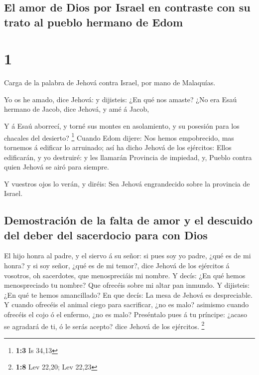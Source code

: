 \hypertarget{el-amor-de-dios-por-israel-en-contraste-con-su-trato-al-pueblo-hermano-de-edom}{%
\subsection{El amor de Dios por Israel en contraste con su trato al
pueblo hermano de
Edom}\label{el-amor-de-dios-por-israel-en-contraste-con-su-trato-al-pueblo-hermano-de-edom}}

\hypertarget{section}{%
\section{1}\label{section}}

 Carga de la palabra de Jehová contra Israel, por mano de
Malaquías.

 Yo os he amado, dice Jehová: y dijisteis: ¿En qué nos
amaste? ¿No era Esaú hermano de Jacob, dice Jehová, y amé á Jacob,

 Y á Esaú aborrecí, y torné sus montes en asolamiento, y
su posesión para los chacales del desierto? \footnote{\textbf{1:3} Is
  34,13}  Cuando Edom dijere: Nos hemos empobrecido, mas
tornemos á edificar lo arruinado; así ha dicho Jehová de los ejércitos:
Ellos edificarán, y yo destruiré: y les llamarán Provincia de impiedad,
y, Pueblo contra quien Jehová se airó para siempre.

 Y vuestros ojos lo verán, y diréis: Sea Jehová
engrandecido sobre la provincia de Israel.

\hypertarget{demostraciuxf3n-de-la-falta-de-amor-y-el-descuido-del-deber-del-sacerdocio-para-con-dios}{%
\subsection{Demostración de la falta de amor y el descuido del deber del
sacerdocio para con
Dios}\label{demostraciuxf3n-de-la-falta-de-amor-y-el-descuido-del-deber-del-sacerdocio-para-con-dios}}

 El hijo honra al padre, y el siervo á su señor: si pues
soy yo padre, ¿qué es de mi honra? y si soy señor, ¿qué es de mi temor?,
dice Jehová de los ejércitos á vosotros, oh sacerdotes, que
menospreciáis mi nombre. Y decís: ¿En qué hemos menospreciado tu nombre?
 Que ofrecéis sobre mi altar pan inmundo. Y dijisteis: ¿En
qué te hemos amancillado? En que decís: La mesa de Jehová es
despreciable.  Y cuando ofrecéis el animal ciego para
sacrificar, ¿no es malo? asimismo cuando ofrecéis el cojo ó el enfermo,
¿no es malo? Preséntalo pues á tu príncipe: ¿acaso se agradará de ti, ó
le serás acepto? dice Jehová de los ejércitos. \footnote{\textbf{1:8}
  Lev 22,20; Lev 22,23}


